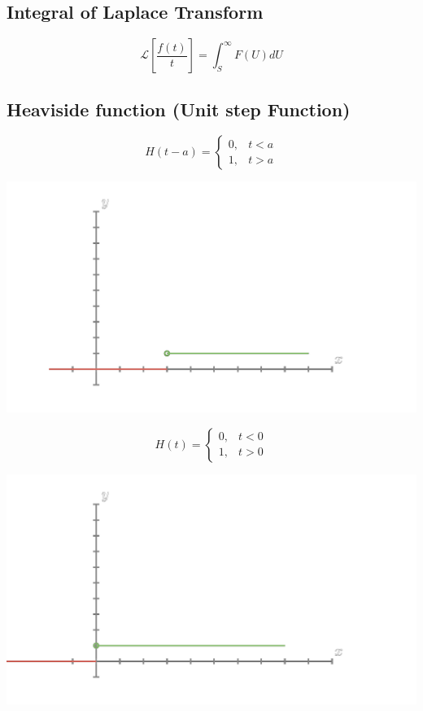\documentclass[11pt]{article}
\theoremstyle{definition}
\newcommand{\bb}{\mathcal{L}}
\begin{document}
\subsection{Integral of Laplace Transform}
\begin{equation}
    \bb[\frac{f(t)}{t}] = \int_S^\infty F(U)dU
\end{equation}    

\subsection{Heaviside function (Unit step Function)} 

\[   
    H(t- a) = 
    \begin{cases}
        0, & \text{$t < a$} \\ 
        1, & \text{$t > a$}
    \end{cases}
\]
\begin{center}
    \includegraphics[scale=0.15]{result.png}
\end{center}


\[   
    H(t) = 
    \begin{cases}
        0, & \text{$t < 0$} \\ 
        1, & \text{$t > 0$}
    \end{cases}
\]
\begin{center}
    \includegraphics[scale=0.15]{result1.png}
\end{center}
\end{document}
